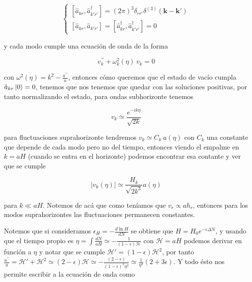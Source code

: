 \begin{equation}
    \begin{cases}
        \displaystyle \left[ \hat{a}_{kr}, \hat{a}_{k'r'}^\dagger \right] = (2 \pi)^3 \delta_{r r'} \delta^{(3)} (\textbf{k} - \textbf{k}')\\
        \displaystyle \left[ \hat{a}_{kr}, \hat{a}_{k'r'} \right] = \left[ \hat{a}^\dagger_{kr}, \hat{a}^\dagger_{k'r'} \right] = 0 
    \end{cases}
\end{equation}

\noindent
y cada modo cumple una ecuación de onda de la forma

\begin{equation}
    v^{\prime \prime}_k + \omega^2_k (\eta) \ v_k = 0
\end{equation}

\noindent
con $\displaystyle \omega^2 (\eta) = k^2 - \frac{a^{\prime \prime}}{a}$, entonces cómo queremos que el estado de vacío cumpla $\hat{a}_{kr} \ket{0} = 0$, tenemos que nos tenemos que quedar con las soluciones positivas, por tanto normalizando el estado, para ondas subhorizonte tenemos 

\begin{equation}
    v_k \simeq \frac{e^{- i k \eta}}{\sqrt{2 k}}
\end{equation}

\noindent
para fluctuaciones suprahorizonte tendremos $v_k \simeq C_k \  a (\eta)$ con $C_k$ una constante que depende de cada modo pero no del tiempo, entonces viendo el empalme en $k = a H$ (cuando se entra en el horizonte) podemos encontrar esa contante y ver que se cumple

\begin{equation}
    | v_k (\eta) | \simeq \frac{H_k}{\sqrt{2 k^3}} a(\eta)
\end{equation}

\noindent
para $k \ll a H$. Notemos de acá que como teníamos que $v_r \propto a h_r$, entonces para los modos suprahorizontes las fluctuaciones permanecen constantes.

Notemos que si consideramos $\displaystyle \epsilon_H = - \frac{d \ln H}{dN}$ se obtiene que $H = H_0 e^{- \epsilon \Delta N}$, y usando que el tiempo propio es $\displaystyle \eta = \int \frac{dN}{aH} \simeq - \frac{1}{(1 - \epsilon) \mathcal{H}}$ con $\mathcal{H} = a H$ podemos derivar en función a $\eta$ y notar que se cumple $\mathcal{H}' = (1 - \epsilon) \mathcal{H}^2$, por tanto $\displaystyle \frac{a^{\prime \prime}}{a} = \mathcal{H}' + \mathcal{H}^2 \simeq (2 - \epsilon) \mathcal{H} \simeq -\frac{(2 - \epsilon)}{(1 - \epsilon)^2 \eta^2} \simeq \frac{1}{\eta^2} \left( 2 + 3 \epsilon \right)$. Y todo ésto nos permite escribir a la ecuación de onda como

